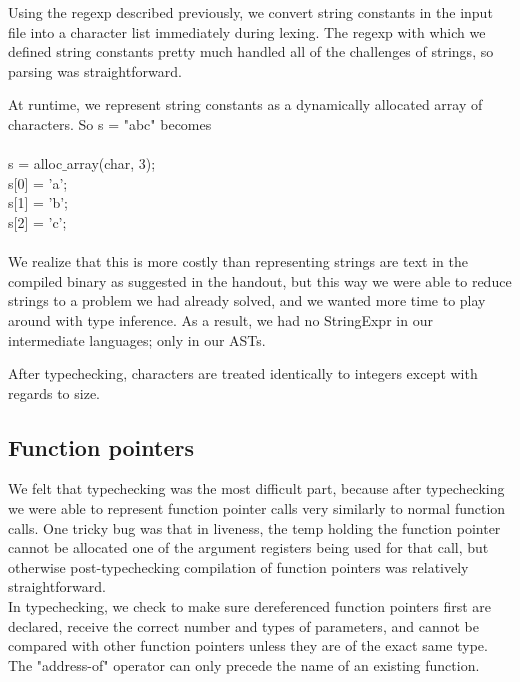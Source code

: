 \documentclass{article}
\begin{document}
Using the regexp described previously, we convert string constants in the input file into a character list immediately during lexing. The regexp with which we defined string constants pretty much handled all of the challenges of strings, so parsing was straightforward.

At runtime, we represent string constants as a dynamically allocated array of characters. So s = "abc" becomes\\
\\
s = alloc$\_$array(char, 3);\\
s[0] = 'a';\\
s[1] = 'b';\\
s[2] = 'c';\\
\\
We realize that this is more costly than representing strings are text in the compiled binary as suggested in the handout, but this way we were able to reduce strings to a problem we had already solved, and we wanted more time to play around with type inference. As a result, we had no StringExpr in our intermediate languages; only in our ASTs.

After typechecking, characters are treated identically to integers except with regards to size.

\subsection{Function pointers}
We felt that typechecking was the most difficult part, because after typechecking we were able to represent function pointer calls very similarly to normal function calls. One tricky bug was that in liveness, the temp holding the function pointer cannot be allocated one of the argument registers being used for that call, but otherwise post-typechecking compilation of function pointers was relatively straightforward.\\ 

In typechecking, we check to make sure dereferenced function pointers first are declared, receive the correct number and types of parameters, and cannot be compared with other function pointers unless they are of the exact same type. The "address-of" operator can only precede the name of an existing function.
\end{document}
